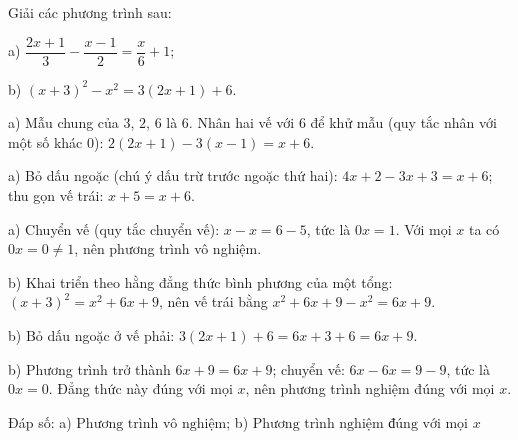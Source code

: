 \begin{problem}[8DS-PT1-038]
Giải các phương trình sau:

a) $\dfrac{2x + 1}{3} - \dfrac{x - 1}{2} = \dfrac{x}{6} + 1$;

b) $(x + 3)^2 - x^2 = 3(2x + 1) + 6$.

\begin{solution}
a) Mẫu chung của $3$, $2$, $6$ là $6$. Nhân hai vế với $6$ để khử mẫu (quy tắc nhân với một số khác $0$): $2(2x + 1) - 3(x - 1) = x + 6$.

a) Bỏ dấu ngoặc (chú ý dấu trừ trước ngoặc thứ hai): $4x + 2 - 3x + 3 = x + 6$; thu gọn vế trái: $x + 5 = x + 6$.

a) Chuyển vế (quy tắc chuyển vế): $x - x = 6 - 5$, tức là $0x = 1$. Với mọi $x$ ta có $0x = 0 \neq 1$, nên phương trình vô nghiệm.

b) Khai triển theo hằng đẳng thức bình phương của một tổng: $(x + 3)^2 = x^2 + 6x + 9$, nên vế trái bằng $x^2 + 6x + 9 - x^2 = 6x + 9$.

b) Bỏ dấu ngoặc ở vế phải: $3(2x + 1) + 6 = 6x + 3 + 6 = 6x + 9$.

b) Phương trình trở thành $6x + 9 = 6x + 9$; chuyển vế: $6x - 6x = 9 - 9$, tức là $0x = 0$. Đẳng thức này đúng với mọi $x$, nên phương trình nghiệm đúng với mọi $x$.

Đáp số: a) $\boxed{\text{Phương trình vô nghiệm}}$; b) $\boxed{\text{Phương trình nghiệm đúng với mọi } x}$
\end{solution}
\end{problem}

